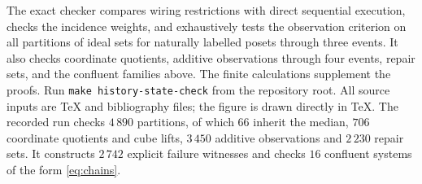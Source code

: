 \documentclass[11pt]{article}
\theoremstyle{definition}
\numberwithin{equation}{section}
\begin{document}
The exact checker  compares wiring
restrictions with direct sequential execution, checks the incidence
weights, and exhaustively tests the observation criterion on all
partitions of ideal sets for naturally labelled posets through three
events. It also checks coordinate quotients, additive observations
through four events, repair sets, and the confluent families above.
The finite calculations supplement the proofs. Run
\texttt{make history-state-check} from the repository root.
All source inputs are TeX and bibliography files; the figure is
drawn directly in TeX.
The recorded run checks $4\,890$ partitions, of which $66$ inherit
the median, $706$ coordinate quotients and cube lifts, $3\,450$
additive observations and $2\,230$ repair sets. It constructs
$2\,742$ explicit failure witnesses and checks $16$ confluent
systems of the form \eqref{eq:chains}.



\end{document}
